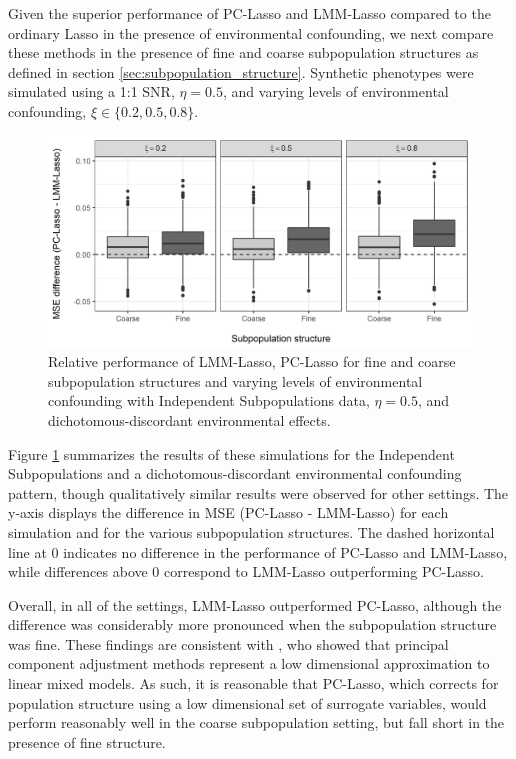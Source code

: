 Given the superior performance of PC-Lasso and LMM-Lasso compared to the ordinary Lasso in the presence of environmental confounding, we next compare these methods in the presence of fine and coarse subpopulation structures as defined in section \ref{sec:subpopulation_structure}. Synthetic phenotypes were simulated using a 1:1 SNR, $\eta = 0.5$, and varying levels of environmental confounding, $\xi \in \{0.2, 0.5,0.8\}$. 

\begin{figure}[H]
    \centering
    \includegraphics[scale = 0.9]{figures/mse_diff_subpops.png}
    \caption{Relative performance of LMM-Lasso, PC-Lasso for fine and coarse subpopulation structures and varying levels of environmental confounding with Independent Subpopulations data, $\eta = 0.5$, and dichotomous-discordant environmental effects. }
    \label{fig:big_vs_small}
\end{figure}

Figure \ref{fig:big_vs_small} summarizes the results of these simulations for the Independent Subpopulations and a dichotomous-discordant environmental confounding pattern, though qualitatively similar results were observed for other settings. The y-axis displays the difference in MSE (PC-Lasso - LMM-Lasso) for each simulation and for the various subpopulation structures. The dashed horizontal line at 0 indicates no difference in the performance of PC-Lasso and LMM-Lasso, while differences above 0 correspond to LMM-Lasso outperforming PC-Lasso.

Overall, in all of the settings, LMM-Lasso outperformed PC-Lasso, although the difference was considerably more pronounced when the subpopulation structure was fine.  These findings are consistent with \citet{hoffman2013correcting}, who showed that principal component adjustment methods represent a low dimensional approximation to linear mixed models. As such, it is reasonable that PC-Lasso, which corrects for population structure using a low dimensional set of surrogate variables, would perform reasonably well in the coarse subpopulation setting, but fall short in the presence of fine structure. 


